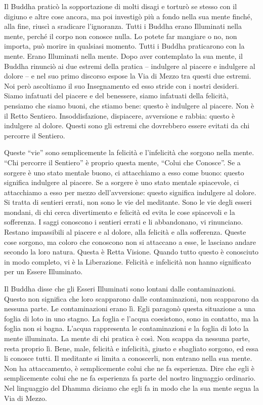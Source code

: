Il Buddha praticò la sopportazione di molti disagi e torturò se stesso
con il digiuno e altre cose ancora, ma poi investigò più a fondo nella
sua mente finché, alla fine, riuscì a sradicare l'ignoranza. Tutti i
Buddha erano Illuminati nella mente, perché il corpo non conosce nulla.
Lo potete far mangiare o no, non importa, può morire in qualsiasi
momento. Tutti i Buddha praticarono con la mente. Erano Illuminati nella
mente. Dopo aver contemplato la sua mente, il Buddha rinunciò ai due
estremi della pratica -- indulgere al piacere e indulgere al dolore -- e
nel suo primo discorso espose la Via di Mezzo tra questi due estremi.
Noi però ascoltiamo il suo Insegnamento ed esso stride con i nostri
desideri. Siamo infatuati del piacere e del benessere, siamo infatuati
della felicità, pensiamo che siamo buoni, che stiamo bene: questo è
indulgere al piacere. Non è il Retto Sentiero. Insoddisfazione,
dispiacere, avversione e rabbia: questo è indulgere al dolore. Questi
sono gli estremi che dovrebbero essere evitati da chi percorre il
Sentiero.

Queste ``vie'' sono semplicemente la felicità e l'infelicità che sorgono
nella mente. ``Chi percorre il Sentiero'' è proprio questa mente,
``Colui che Conosce''. Se a sorgere è uno stato mentale buono, ci
attacchiamo a esso come buono: questo significa indulgere al piacere. Se
a sorgere è uno stato mentale spiacevole, ci attacchiamo a esso per
mezzo dell'avversione: questo significa indulgere al dolore. Si tratta
di sentieri errati, non sono le vie del meditante. Sono le vie degli
esseri mondani, di chi cerca divertimento e felicità ed evita le cose
spiacevoli e la sofferenza. I saggi conoscono i sentieri errati e li
abbandonano, vi rinunciano. Restano impassibili al piacere e al dolore,
alla felicità e alla sofferenza. Queste cose sorgono, ma coloro che
conoscono non si attaccano a esse, le lasciano andare secondo la loro
natura. Questa è Retta Visione. Quando tutto questo è conosciuto in modo
completo, vi è la Liberazione. Felicità e infelicità non hanno
significato per un Essere Illuminato.

Il Buddha disse che gli Esseri Illuminati sono lontani dalle
contaminazioni. Questo non significa che loro scapparono dalle
contaminazioni, non scapparono da nessuna parte. Le contaminazioni erano
lì. Egli paragonò questa situazione a una foglia di loto in uno stagno.
La foglia e l'acqua coesistono, sono in contatto, ma la foglia non si
bagna. L'acqua rappresenta le contaminazioni e la foglia di loto la
mente illuminata. La mente di chi pratica è così. Non scappa da nessuna
parte, resta proprio lì. Bene, male, felicità e infelicità, giusto e
sbagliato sorgono, ed essa li conosce tutti. Il meditante si limita a
conoscerli, non entrano nella sua mente. Non ha attaccamento, è
semplicemente colui che ne fa esperienza. Dire che egli è semplicemente
colui che ne fa esperienza fa parte del nostro linguaggio ordinario. Nel
linguaggio del Dhamma diciamo che egli fa in modo che la sua mente segua
la Via di Mezzo.

